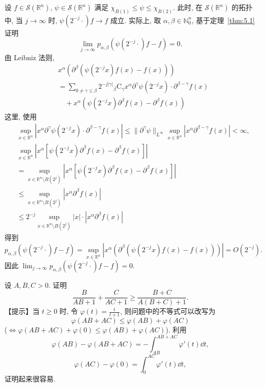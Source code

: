 \begin{example}\label{exa:5.7}
设 $f \in \mathcal{S}(\mathbb{R}^{n})$, $\psi \in \mathcal{S}(\mathbb{R}^{n})$ 满足 $\chi_{B(1)} \leq \psi \leq \chi_{B(2)}$. 此时, 在 $\mathcal{S}(\mathbb{R}^{n})$ 的拓扑中, 当 $j \to \infty$ 时, $\psi(2^{-j}\cdot)f \to f$ 成立. 实际上, 取 $\alpha, \beta \in \mathbb{N}_{0}^{n}$, 基于定理~\ref{thm:5.1} 证明
\[
\lim_{j \to \infty}p_{\alpha,\beta}(\psi(2^{-j}\cdot)f - f) = 0.
\]
由 Leibniz 法则,
\begin{align*}
&x^{\alpha}(\partial^{\beta}(\psi(2^{-j}x)f(x) - f(x))) \\
&= \sum_{0 \neq \gamma \leq \beta}2^{-j|\gamma|}{}_{\beta}\mathrm{C}_{\gamma}x^{\alpha}\partial^{\gamma}\psi(2^{-j}x) \cdot \partial^{\beta-\gamma}f(x) \\
&\quad + x^{\alpha}(\psi(2^{-j}x)\partial^{\beta}f(x) - \partial^{\beta}f(x))
\end{align*}
这里, 使用
\begin{align*}
&\sup_{x \in \mathbb{R}^{n}}|x^{\alpha}\partial^{\gamma}\psi(2^{-j}x) \cdot \partial^{\beta-\gamma}f(x)| \leq \|\partial^{\gamma}\psi\|_{L^{\infty}}\sup_{x \in \mathbb{R}^{n}}|x^{\alpha}\partial^{\beta-\gamma}f(x)| < \infty, \\
&\sup_{x \in \mathbb{R}^{n}}|x^{\alpha}[\psi(2^{-j}x)\partial^{\beta}f(x) - \partial^{\beta}f(x)]| \\
&= \sup_{x \in \mathbb{R}^{n}\setminus B(2^{j})}|x^{\alpha}[\psi(2^{-j}x)\partial^{\beta}f(x) - \partial^{\beta}f(x)]| \\
&\leq \sup_{x \in \mathbb{R}^{n}\setminus B(2^{j})}|x^{\alpha}\partial^{\beta}f(x)| \\
&\leq 2^{-j}\sup_{x \in \mathbb{R}^{n}\setminus B(2^{j})}|x| \cdot |x^{\alpha}\partial^{\beta}f(x)|
\end{align*}
得到
\[
p_{\alpha,\beta}(\psi(2^{-j}\cdot)f - f) = \sup_{x \in \mathbb{R}^{n}}|x^{\alpha}(\partial^{\beta}(\psi(2^{-j}x)f(x) - f(x)))| = O(2^{-j}).
\]
因此 $\lim_{j \to \infty}p_{\alpha,\beta}(\psi(2^{-j}\cdot)f - f) = 0$.
\end{example}

\begin{exercise}\label{exer:5.1}
设 $A, B, C > 0$. 证明
\[
\frac{B}{AB+1} + \frac{C}{AC+1} \geq \frac{B+C}{A(B+C)+1}.
\]
【提示】当 $t \geq 0$ 时, 令 $\varphi(t) = \frac{t}{t+1}$, 则问题中的不等式可以改写为
\[
\varphi(AB + AC) \leq \varphi(AB) + \varphi(AC)
\]
($\iff \varphi(AB + AC) + \varphi(0) \leq \varphi(AB) + \varphi(AC)$).
利用
\[
\varphi(AB) - \varphi(AB + AC) = -\int_{AB}^{AB+AC}\varphi'(t)\dd t,
\]
\[
\varphi(AC) - \varphi(0) = \int_{0}^{AC}\varphi'(t)\dd t,
\]
证明起来很容易.
\end{exercise}

